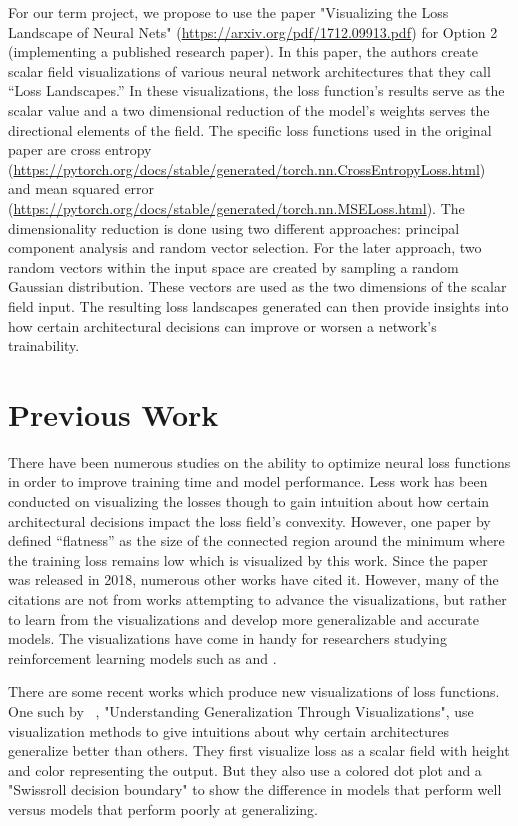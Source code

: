 \documentclass{acmsiggraph}
\begin{document}
For our term project, we propose to use the paper "Visualizing the Loss Landscape of Neural Nets" (\url{https://arxiv.org/pdf/1712.09913.pdf}) for Option 2 (implementing a published research paper). In this paper, the authors create scalar field visualizations of various neural network architectures that they call “Loss Landscapes.” In these visualizations, the loss function’s results serve as the scalar value and a two dimensional reduction of the model’s weights serves the directional elements of the field. The specific loss functions used in the original paper are cross entropy (\url{https://pytorch.org/docs/stable/generated/torch.nn.CrossEntropyLoss.html}) and mean squared error (\url{https://pytorch.org/docs/stable/generated/torch.nn.MSELoss.html}).
The dimensionality reduction is done using two different approaches: principal component analysis and random vector selection. For the later approach, two random vectors within the input space are created by sampling a random Gaussian distribution. These vectors are used as the two dimensions of the scalar field input. The resulting loss landscapes generated can then provide insights into how certain architectural decisions can improve or worsen a network's trainability.


\section{Previous Work}
\label{sec:previous_work}

There have been numerous studies on the ability to optimize neural loss functions in order to improve training time and model performance. Less work has been conducted on visualizing the losses though to gain intuition about how certain architectural decisions impact the loss field's convexity. However, one paper by ~\cite{hochreiter1997flat} defined “flatness” as the size of the connected region around the minimum where the training loss remains low which is visualized by this work. Since the paper was released in 2018, numerous other works have cited it. However, many of the citations are not from works attempting to advance the visualizations, but rather to learn from the visualizations and develop more generalizable and accurate models. The visualizations have come in handy for researchers studying reinforcement learning models such as \cite{actor2020} and \cite{plaat2022deep}.

There are some recent works which produce new visualizations of loss functions. One such by ~\cite{pmlr-v137-huang20a}, "Understanding Generalization Through Visualizations", use
visualization methods to give intuitions about why certain architectures generalize better than others. They first visualize loss as a scalar field with height and color representing the output. But they also use a colored dot plot and a "Swissroll decision boundary" to show the difference in models that perform well versus models that perform poorly at generalizing.
\end{document}
